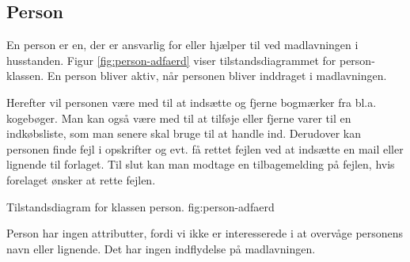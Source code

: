 \subsection{Person}
\label{sec:person}

En person er en, der er ansvarlig for eller hjælper til ved madlavningen i husstanden. Figur \ref{fig:person-adfaerd} viser tilstandsdiagrammet for person-klassen. En person bliver aktiv, når personen bliver inddraget i madlavningen. 

Herefter vil personen være med til at indsætte og fjerne bogmærker fra bl.a. kogebøger. Man kan også være med til at tilføje eller fjerne varer til en indkøbsliste, som man senere skal bruge til at handle ind. Derudover kan personen finde fejl i opskrifter og evt. få rettet fejlen ved at indsætte en mail eller lignende til forlaget. Til slut kan man modtage en tilbagemelding på fejlen, hvis forelaget ønsker at rette fejlen.

            {Tilstandsdiagram for klassen person.}
            {fig:person-adfaerd}

Person har ingen attributter, fordi vi \fx ikke er interesserede i at overvåge personens navn eller lignende. Det har ingen indflydelse på madlavningen.
